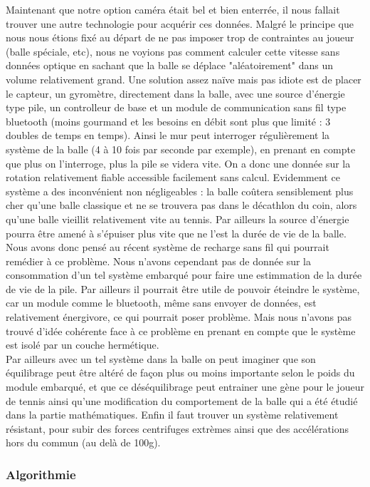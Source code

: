 Maintenant que notre option caméra était bel et bien enterrée, il nous fallait trouver une autre technologie pour acquérir ces données. Malgré le principe que nous nous étions fixé au départ de ne pas imposer trop de contraintes au joueur (balle spéciale, etc), nous ne voyions pas comment calculer cette vitesse sans données optique en sachant que la balle se déplace "aléatoirement" dans un volume relativement grand. Une solution assez naïve mais pas idiote est de placer le capteur, un gyromètre, directement dans la balle, avec une source d'énergie type pile, un controlleur de base et un module de communication sans fil type bluetooth (moins gourmand et les besoins en débit sont plus que limité : 3 doubles de temps en temps). Ainsi le mur peut interroger régulièrement la système de la balle (4 à 10 fois par seconde par exemple), en prenant en compte que plus on l'interroge, plus la pile se videra vite. On a donc une donnée sur la rotation relativement fiable accessible facilement sans calcul. Evidemment ce système a des inconvénient non négligeables : la balle coûtera sensiblement plus cher qu'une balle classique et ne se trouvera pas dans le décathlon du coin, alors qu'une balle vieillit relativement vite au tennis. Par ailleurs la source d'énergie pourra être amené à s'épuiser plus vite que ne l'est la durée de vie de la balle. Nous avons donc pensé au récent système de recharge sans fil qui pourrait remédier à ce problème. Nous n'avons cependant pas de donnée sur la consommation d'un tel système embarqué pour faire une estimmation de la durée de vie de la pile. Par ailleurs il pourrait être utile de pouvoir éteindre le système, car un module comme le bluetooth, même sans envoyer de données, est relativement énergivore, ce qui pourrait poser problème. Mais nous n'avons pas trouvé d'idée cohérente face à ce problème en prenant en compte que le système est isolé par un couche hermétique. \\

Par ailleurs avec un tel système dans la balle on peut imaginer que son équilibrage peut être altéré de façon plus ou moins importante selon le poids du module embarqué, et que ce déséquilibrage peut entrainer une gène pour le joueur de tennis ainsi qu'une modification du comportement de la balle qui a été étudié dans la partie mathématiques. Enfin il faut trouver un système relativement résistant, pour subir des forces centrifuges extrèmes ainsi que des accélérations hors du commun (au delà de 100g).

\subsubsection{Algorithmie}

